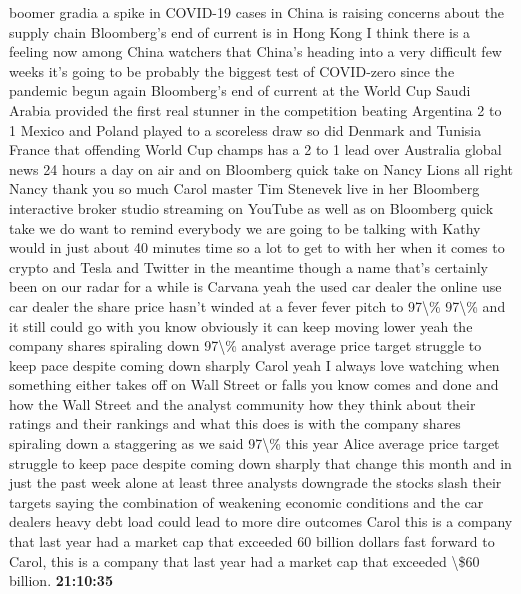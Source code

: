 \documentclass{article}%
\begin{document}
boomer gradia a spike in COVID{-}19 cases in China is raising concerns about the supply chain Bloomberg's end of current is in Hong Kong I think there is a feeling now among China watchers that China's heading into a very difficult few weeks it's going to be probably the biggest test of COVID{-}zero since the pandemic begun again Bloomberg's end of current at the World Cup Saudi Arabia provided the first real stunner in the competition beating Argentina 2 to 1 Mexico and Poland played to a scoreless draw so did Denmark and Tunisia France that offending World Cup champs has a 2 to 1 lead over Australia global news 24 hours a day on air and on Bloomberg quick take on Nancy Lions all right Nancy thank you so much Carol master Tim Stenevek live in her Bloomberg interactive broker studio streaming on YouTube as well as on Bloomberg quick take we do want to remind everybody we are going to be talking with Kathy would in just about 40 minutes time so a lot to get to with her when it comes to crypto and Tesla and Twitter in the meantime though a name that's certainly been on our radar for a while is Carvana yeah the used car dealer the online use car dealer the share price hasn't winded at a fever fever pitch to 97\textbackslash{}\% 97\textbackslash{}\% and it still could go with you know obviously it can keep moving lower yeah the company shares spiraling down 97\textbackslash{}\% analyst average price target struggle to keep pace despite coming down sharply Carol yeah I always love watching when something either takes off on Wall Street or falls you know comes and done and how the Wall Street and the analyst community how they think about their ratings and their rankings and what this does is with the company shares spiraling down a staggering as we said 97\textbackslash{}\% this year Alice average price target struggle to keep pace despite coming down sharply that change this month and in just the past week alone at least three analysts downgrade the stocks slash their targets saying the combination of weakening economic conditions and the car dealers heavy debt load could lead to more dire outcomes Carol this is a company that last year had a market cap that exceeded 60 billion dollars fast forward to  Carol, this is a company that last year had a market cap that exceeded \textbackslash{}\$60 billion.%
\textbf{21:10:35}%
\newline%
\end{document}
